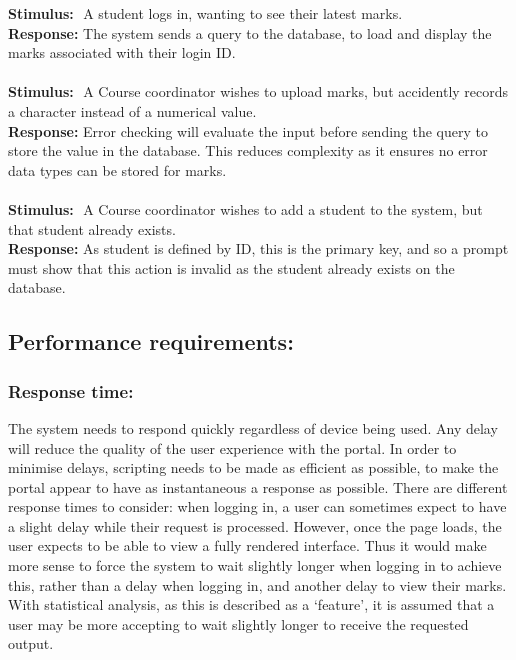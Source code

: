 \documentclass[paper=a4, fontsize=11pt]{scrartcl}
\numberwithin{equation}{section}		%
\numberwithin{figure}{section}			%
\numberwithin{table}{section}				%
\begin{document}
\textbf{Stimulus:} ​ A student logs in, wanting to see their latest marks.\\
\textbf{Response:}​ The system sends a query to the database, to load and display the marks
associated with their login ID.\\ \\
\textbf{Stimulus:} ​ A Course coordinator wishes to upload marks, but accidently records a character
instead of a numerical value.\\
\textbf{Response:}​ Error checking will evaluate the input before sending the query to store the value
in the database. This reduces complexity as it ensures no error data types can be stored for
marks.\\ \\
\textbf{Stimulus:} ​ A Course coordinator wishes to add a student to the system, but that student
already exists.\\
\textbf{Response:}​ As student is defined by ID, this is the primary key, and so a prompt must show
that this action is invalid as the student already exists on the database.
\\
\subsection{Performance requirements:}
\subsubsection{Response time:}
The system needs to respond quickly regardless of device being used. Any delay will reduce
the quality of the user experience with the portal. In order to minimise delays, scripting needs
to be made as efficient as possible, to make the portal appear to have as instantaneous a
response as possible. There are different response times to consider: when logging in, a
user can sometimes expect to have a slight delay while their request is processed. However,
once the page loads, the user expects to be able to view a fully rendered interface. Thus it
would make more sense to force the system to wait slightly longer when logging in to
achieve this, rather than a delay when logging in, and another delay to view their marks.
With statistical analysis, as this is described as a ‘feature’, it is assumed that a user may be
more accepting to wait slightly longer to receive the requested output.
\end{document}
